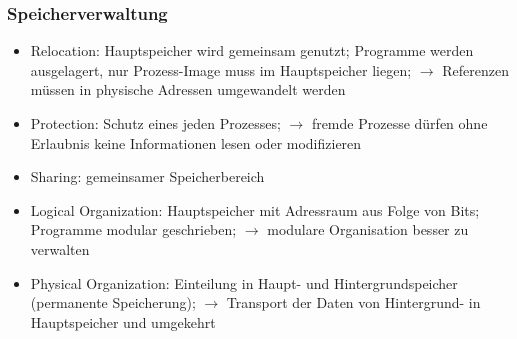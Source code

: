 \documentclass{article}
\begin{document}
\subsubsection{Speicherverwaltung}
    \begin{itemize}
        \item Relocation: Hauptspeicher wird gemeinsam genutzt; Programme werden ausgelagert, nur Prozess-Image muss im Hauptspeicher liegen; $\rightarrow$ Referenzen müssen in physische Adressen umgewandelt werden
        \item Protection: Schutz eines jeden Prozesses; $\rightarrow$ fremde Prozesse dürfen ohne Erlaubnis keine Informationen lesen oder modifizieren
        \item Sharing: gemeinsamer Speicherbereich 
        \item Logical Organization: Hauptspeicher mit Adressraum aus Folge von Bits; Programme modular geschrieben; $\rightarrow$ modulare Organisation besser zu verwalten 
        \item Physical Organization: Einteilung in Haupt- und Hintergrundspeicher (permanente Speicherung); $\rightarrow$ Transport der Daten von Hintergrund- in Hauptspeicher und umgekehrt
    \end{itemize}
\end{document}

